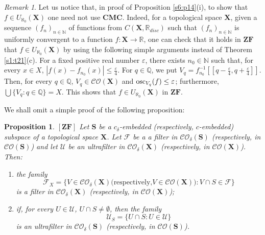 \documentclass[12pt,twoside,leqno]{article}
\theoremstyle{plain}
\newtheorem{proposition}[theorem]{Proposition}
\theoremstyle{definition}
\theoremstyle{remark}
\newtheorem{remark}[theorem]{Remark}
\DeclareMathOperator{\osc}{{\rm osc}}
\begin{document}
\begin{remark}
	\label{s5:r015}
	Let us notice that, in proof of Proposition \ref{s6:p14}(i), to show that $f\in U_{\aleph_0}(\mathbf{X})$ one need not use $\mathbf{CMC}$. Indeed, for a topological space $\mathbf{X}$, given a sequence $(f_n)_{n\in\mathbb{N}}$ of functions from $C(\mathbf{X}, \mathbb{R}_{disc})$  such that $(f_n)_{n\in\mathbb{N}}$ is uniformly convergent to a function $f:\mathbf{X}\to\mathbb{R}$, one can check that it holds in $\mathbf{ZF}$ that $f\in U_{\aleph_0}(\mathbf{X})$ by using the following simple arguments instead of Theorem \ref{s1:t21}(c). For a fixed positive real number $\varepsilon$, there exists $n_0\in\mathbb{N}$ such that, for every $x\in X$, $|f(x)-f_{n_0}(x)|\leq\frac{\varepsilon}{4}$. For $q\in\mathbb{Q}$, we put $V_q=f_{n_0}^{-1}[[q-\frac{\varepsilon}{4}, q+\frac{\varepsilon}{4}]]$. Then, for every $q\in\mathbb{Q}$, $V_q\in\mathcal{CO}(\mathbf{X})$ and $\osc_{V_q}(f)\leq\varepsilon$; furthermore, $\bigcup\{ V_q: q\in\mathbb{Q}\}=X$. This shows that $f\in U_{\aleph_0}(\mathbf{X})$ in $\mathbf{ZF}$.
\end{remark}

We shall omit a simple proof of the following proposition:

\begin{proposition}
	\label{s6:p15}
	$[\mathbf{ZF}]$
	Let $\mathbf{S}$ be a $c_{\delta}$-embedded (respectively, $c$-embedded) subspace of a topological space $\mathbf{X}$. Let $\mathcal{F}$ be a a filter in $\mathcal{CO}_{\delta}(\mathbf{S})$ (respectively, in $\mathcal{CO}(\mathbf{S})$) and let $\mathcal{U}$ be an ultrafilter in $\mathcal{CO}_{\delta}(\mathbf{X})$ (respectively, in $\mathcal{CO}(\mathbf{X})$). Then:
	\begin{enumerate} 
		\item[(i)] the family 
		$$\mathcal{F}_X=\{V\in\mathcal{CO}_{\delta}(\mathbf{X}) \text{(respectively,} V\in\mathcal{CO}(\mathbf{X})\text{)}: V\cap S\in\mathcal{F}\}$$ is a filter in $\mathcal{CO}_{\delta}(\mathbf{X})$ (respectively, in $\mathcal{CO}(\mathbf{X})$);
		\item[(ii)] if, for every $U\in\mathcal{U}$, $U\cap S\neq\emptyset$, then the family 
		$$\mathcal{U}_S=\{U\cap S: U\in\mathcal{U}\}$$
		is an ultrafilter in $\mathcal{CO}_{\delta}(\mathbf{S})$ (respectively, in $\mathcal{CO}(\mathbf{S})$).  
	\end{enumerate} 
\end{proposition}
\end{document}
